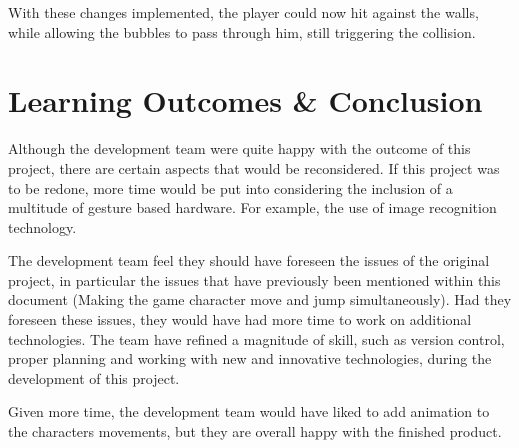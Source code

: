 \documentclass{article}
\begin{document}
\bigskip

With these changes implemented, the player could now hit against the walls, while allowing the bubbles to pass through him, still triggering the collision. 

\section{Learning Outcomes \& Conclusion}
Although the development team were quite happy with the outcome of this project, there are certain aspects that would be reconsidered. If this project was to be redone, more time would be put into considering the inclusion of a multitude of gesture based hardware. For example, the use of image recognition technology.

\bigskip

The development team feel they should have foreseen the issues of the original project, in particular the issues that have previously been mentioned within this document (Making the game character move and jump simultaneously). Had they foreseen these issues, they would have had more time to work on additional technologies. The team have refined a magnitude of skill, such as version control, proper planning and working with new and innovative technologies, during the development of this project.

\bigskip

Given more time, the development team would have liked to add animation to the characters movements, but they are overall happy with the finished product.
\end{document}
